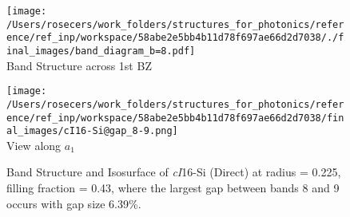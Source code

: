 \begin{figure}[H]
\begin{minipage}{0.5\textwidth}\centering
\texttt{[image: /Users/rosecers/work\_folders/structures\_for\_photonics/reference/ref\_inp/workspace/58abe2e5bb4b11d78f697ae66d2d7038/./final\_images/band\_diagram\_b=8.pdf]}
\\Band Structure across 1st BZ
\end{minipage}\hfill
\begin{minipage}{0.48\textwidth}\centering
\texttt{[image: /Users/rosecers/work\_folders/structures\_for\_photonics/reference/ref\_inp/workspace/58abe2e5bb4b11d78f697ae66d2d7038/final\_images/cI16-Si@gap\_8-9.png]}
\\View along $a_1$ 
\end{minipage}\hfill\caption{Band Structure and Isosurface of \textit{cI}16-Si (Direct) at radius = 0.225, filling fraction = 0.43, where the largest gap between bands 8 and 9 occurs with gap size 6.39\%.}

\end{figure}
\vspace{-0.25in}


